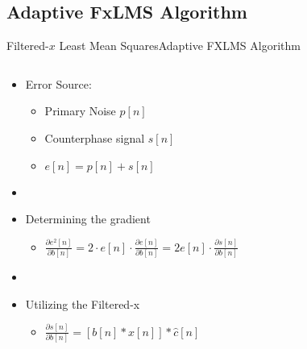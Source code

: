 \subsection{Adaptive FxLMS Algorithm}
\begin{frame}{Filtered-$x$ Least Mean Squares}{Adaptive FXLMS Algorithm}

	\begin{columns}
		\begin{column}{0.5\textwidth}
		\begin{center}
		

		\begin{itemize}
		\item[] Error Source:
		\begin{itemize}
		\item Primary Noise $p[n]$
		\item Counterphase signal $s[n]$
		\item $e[n]=p[n]+s[n]$
		\end{itemize}
		\item[]
		\item[] Determining the gradient
		\begin{itemize}
		\item[] $\frac{\partial e^2[n]}{\partial b[n]}=2 \cdot e[n] \cdot \frac{\partial e[n]}{\partial b[n]} =2e[n] \cdot \frac{\partial s[n]}{\partial b[n]}$
		\end{itemize}
		\item[]
		\item[] Utilizing the Filtered-x
		\begin{itemize}
		\item[] $\frac{\partial s[n]}{\partial b[n]} = [b[n] * x[n]]* \hat{c}[n]$
		\end{itemize}			
		\end{itemize}
		\end{center}	
		
		
		
		
		\end{column}
		\begin{column}{0.5\textwidth}
\end{column}
\end{columns}
\end{frame}
